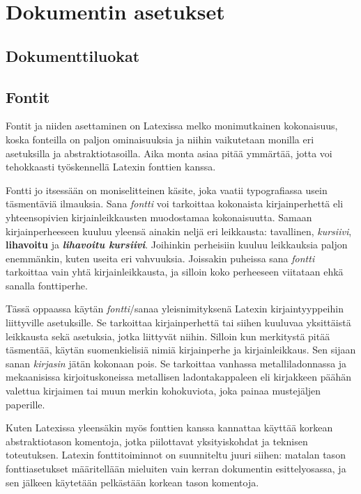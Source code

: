 \chapter{Dokumentin asetukset}
\section{Dokumenttiluokat}
\label{luku:dokumenttiluokat}
\section{Fontit}
\label{luku:kirjaintyypit}

Fontit ja niiden asettaminen on Latexissa melko monimutkainen
kokonaisuus, koska fonteilla on paljon ominaisuuksia ja niihin
vaikutetaan monilla eri asetuksilla ja abstraktiotasoilla. Aika monta
asiaa pitää ymmärtää, jotta voi tehokkaasti työskennellä Latexin
fonttien kanssa.

Fontti jo itsessään on moniselitteinen käsite, joka vaatii typografiassa
usein täsmentäviä ilmauksia. Sana \emph{fontti} voi tarkoittaa
kokonaista kirjainperhettä eli yhteensopivien kirjainleikkausten
muodostamaa kokonaisuutta. Samaan kirjainperheeseen kuuluu yleensä
ainakin neljä eri leikkausta: tavallinen, \textit{kursiivi},
\textbf{lihavoitu} ja \textbf{\textit{lihavoitu kursiivi}}. Joihinkin
perheisiin kuuluu leikkauksia paljon enemmänkin, kuten useita eri
vahvuuksia. Joissakin puheissa sana \emph{fontti} tarkoittaa vain yhtä
kirjainleikkausta, ja silloin koko perheeseen viitataan ehkä sanalla
fonttiperhe.

Tässä oppaassa käytän \emph{fontti}\-/sanaa yleisnimityksenä Latexin
kirjaintyyppeihin liittyville asetuksille. Se tarkoittaa kirjainperhettä
tai siihen kuuluvaa yksittäistä leikkausta sekä asetuksia, jotka
liittyvät niihin. Silloin kun merkitystä pitää täsmentää, käytän
suomenkielisiä nimiä kirjainperhe ja kirjainleikkaus. Sen sijaan sanan
\emph{kirjasin} jätän kokonaan pois. Se tarkoittaa vanhassa
metalliladonnassa ja mekaanisissa kirjoituskoneissa metallisen
ladontakappaleen eli kirjakkeen päähän valettua kirjaimen tai muun
merkin kohokuviota, joka painaa mustejäljen paperille.

Kuten Latexissa yleensäkin myös fonttien kanssa kannattaa käyttää
korkean abstraktiotason komentoja, jotka piilottavat yksityiskohdat ja
teknisen toteutuksen. Latexin fonttitoiminnot on suunniteltu juuri
siihen: matalan tason fontti\-asetukset määritellään mieluiten vain
kerran dokumentin esittelyosassa, ja sen jälkeen käytetään pelkästään
korkean tason komentoja.

